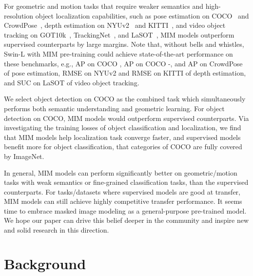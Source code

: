 \documentclass{article}
\begin{document}
For geometric and motion tasks that require weaker semantics and high-resolution object localization capabilities, such as pose estimation on COCO~\cite{lin2014microsoft} and CrowdPose~\cite{li2019crowd}, depth estimation on NYUv2~\cite{nathan2012nyuv2} and KITTI~\cite{andreas2013kitti}, and video object tracking on GOT10k~\cite{huang2021got10k}, TrackingNet~\cite{muller2018tracknet}, and LaSOT~\cite{fan2019lasot}, MIM models outperform supervised counterparts by large margins. Note that, without bells and whistles, Swin-L with MIM pre-training could achieve state-of-the-art performance on these benchmarks, e.g.,  AP on COCO ,  AP on COCO -, and  AP on CrowdPose of pose estimation,  RMSE on NYUv2 and  RMSE on KITTI of depth estimation, and  SUC on LaSOT of video object tracking.

We select object detection on COCO as the combined task which simultaneously performs both semantic understanding and geometric learning. For object detection on COCO, MIM models would outperform supervised counterparts. 
Via investigating the training losses of object classification and localization, we find that MIM models help localization task converge faster, and supervised models benefit more for object classification, that categories of COCO are fully covered by ImageNet.


In general, MIM models can perform significantly better on geometric/motion tasks with weak semantics or fine-grained classification tasks, than the supervised counterparts. For tasks/datasets where supervised models are good at transfer, MIM models can still achieve highly competitive transfer performance. It seems time to embrace masked image modeling as a general-purpose pre-trained model. We hope our paper can drive this belief deeper in the community and inspire new and solid research in this direction.



\section{Background}
\end{document}
